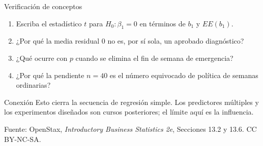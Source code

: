 \documentclass[aspectratio=169,10pt,spanish]{beamer}
\begin{document}
\begin{frame}{Verificación de conceptos}
  \begin{enumerate}
    \item Escriba el estadístico $t$ para $H_0:\beta_1=0$ en términos de
      $b_1$ y $EE(b_1)$.
    \item ¿Por qué la media residual 0 no es, por sí sola, un aprobado
      diagnóstico?
    \item ¿Qué ocurre con $p$ cuando se elimina el fin de semana de
      emergencia?
    \item ¿Por qué la pendiente $n=40$ es el número equivocado de política
      de semanas ordinarias?
  \end{enumerate}

  \vspace{0.6em}
  \begin{block}{Conexión}
    Esto cierra la secuencia de regresión simple. Los predictores múltiples
    y los experimentos diseñados son cursos posteriores; el límite aquí es
    la influencia.
  \end{block}

  \vfill
  \scriptsize Fuente: OpenStax, \textit{Introductory Business Statistics 2e},
  Secciones 13.2 y 13.6. CC BY-NC-SA.
\end{frame}

\appendix
\end{document}
